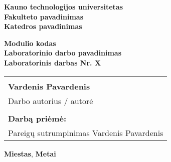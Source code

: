 \documentclass[a4paper,12pt]{article}
\begin{document}
\begin{titlepage}

\newcommand{\universitetas}{Kauno technologijos universitetas}
\newcommand{\fakultetas}{Fakulteto pavadinimas}
\newcommand{\katedra}{Katedros pavadinimas}
\newcommand{\modulioKodas}{Modulio kodas}
\newcommand{\pavadinimas}{Laboratorinio darbo pavadinimas}
\newcommand{\darboNr}{Laboratorinis darbas Nr. X}
\newcommand{\atliko}{Vardenis Pavardenis}
\newcommand{\autorius}{Darbo autorius / autorė}
\newcommand{\prieme}{Pareigų sutrumpinimas Vardenis Pavardenis}
\newcommand{\miestas}{Miestas}
\newcommand{\metai}{Metai}

\renewcommand{\headrulewidth}{0pt}

\onehalfspacing
\center
\textbf{\universitetas} \\ [5mm]
\textbf{\fakultetas} \\ [5mm]
\textbf{\katedra} \vfill

\normalsize
\textbf{\modulioKodas} \\ [5mm]
\LARGE\textbf{\pavadinimas} \\ [5mm]
\normalsize\textbf{\darboNr} \vfill

\begin{tabular}{p{10cm}}
\hline
\\[0.5cm]
\textbf{\atliko} \\[5pt]
\autorius \\[1.5cm]
\hline
\\[0.5cm]
\textbf{Darbą priėmė:} \\[5pt]
\prieme \\[1.5cm]
\hline
\end{tabular}

\vfill
\center
\textbf{\miestas}, \textbf{\metai}

\end{titlepage}
\end{document}
